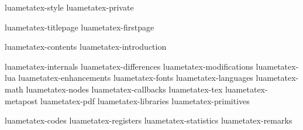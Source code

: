 





\pushoverloadmode \unprotect
\protect \popoverloadmode

\enabletrackers[system.usage=summary]

\environment luametatex-style
\environment luametatex-private

\startdocument
  [manual=LuaMeta\TeX,
   version=\cldcontext{status.luatex_verbose}]

\component luametatex-titlepage
\component luametatex-firstpage

\startfrontmatter
    \component luametatex-contents
    \component luametatex-introduction
\stopfrontmatter

\startbodymatter
    \component luametatex-internals
    \component luametatex-differences
    \component luametatex-modifications
    \component luametatex-lua
    \component luametatex-enhancements
    \component luametatex-fonts
    \component luametatex-languages
    \component luametatex-math
    \component luametatex-nodes
    \component luametatex-callbacks
    \component luametatex-tex
    \component luametatex-metapost
    \component luametatex-pdf
    \component luametatex-libraries
    \component luametatex-primitives
\stopbodymatter

\startbackmatter
    \component luametatex-codes
    \component luametatex-registers
    \component luametatex-statistics
    \component luametatex-remarks
\stopbackmatter

\stopdocument

